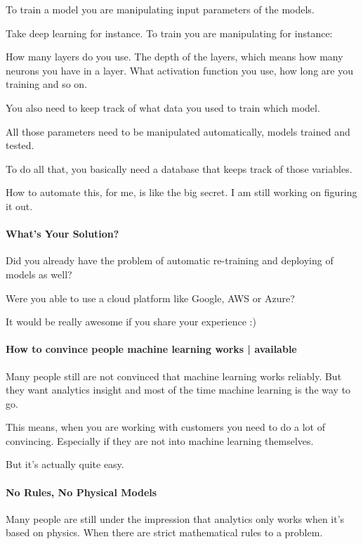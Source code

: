 \documentclass[12pt]{scrartcl} %
\begin{document}
To train a model you are manipulating input parameters of the models.

Take deep learning for instance. To train you are manipulating for instance:

How many layers do you use. The depth of the layers, which means how many neurons you have in a layer. What activation function you use, how long are you training and so on.

You also need to keep track of what data you used to train which model.

All those parameters need to be manipulated automatically, models trained and tested.

To do all that, you basically need a database that keeps track of those variables.

How to automate this, for me, is like the big secret. I am still working on figuring it out.

\paragraph{What’s Your Solution?}

Did you already have the problem of automatic re-training and deploying of models as well?

Were you able to use a cloud platform like Google, AWS or Azure?

It would be really awesome if you share your experience :)

\paragraph{How to convince people machine learning works | available}
Many people still are not convinced that machine learning works reliably. But they want analytics insight and most of the time machine learning is the way to go.

This means, when you are working with customers you need to do a lot of convincing. Especially if they are not into machine learning themselves.

But it's actually quite easy.

\paragraph{No Rules, No Physical Models}

Many people are still under the impression that analytics only works when it’s based on physics. When there are strict mathematical rules to a problem.
\end{document}
